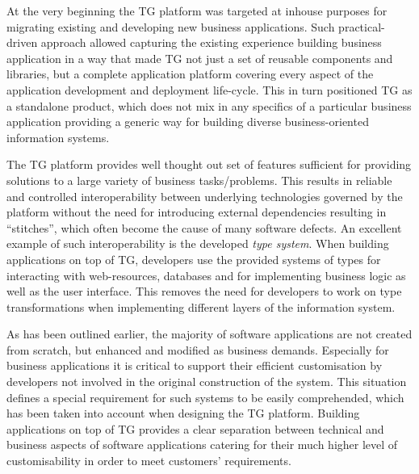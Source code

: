   At the very beginning the TG platform was targeted at inhouse purposes for migrating existing and developing new business applications.
  Such practical-driven approach allowed capturing the existing experience building business application in a way that made TG not just a set of reusable components and libraries, but a complete application platform covering every aspect of the application development and deployment life-cycle.
  This in turn positioned TG as a standalone product, which does not mix in any specifics of a particular business application providing a generic way for building diverse business-oriented information systems.

  The TG platform provides well thought out set of features sufficient for providing solutions to a large variety of business tasks/problems.
  This results in reliable and controlled interoperability between underlying technologies governed by the platform without the need for introducing external dependencies resulting in ``stitches'', which often become the cause of many software defects.
  An excellent example of such interoperability is the developed \emph{type system}.
  When building applications on top of TG, developers use the provided systems of types for interacting with web-resources, databases and for implementing business logic as well as the user interface.
  This removes the need for developers to work on type transformations when implementing different layers of the information system.
  
  As has been outlined earlier, the majority of software applications are not created from scratch, but enhanced and modified as business demands.
  Especially for business applications it is critical to support their efficient customisation by developers not involved in the original construction of the system.
  This situation defines a special requirement for such systems to be easily comprehended, which has been taken into account when designing the TG platform.
  Building applications on top of TG provides a clear separation between technical and business aspects of software applications catering for their much higher level of customisability in order to meet customers' requirements.